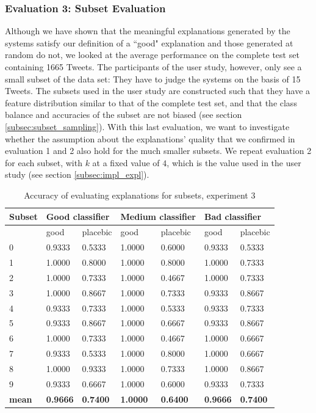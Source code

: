 \subsubsection{Evaluation 3: Subset Evaluation}
Although we have shown that the meaningful explanations generated by the systems satisfy our definition of a ``good" explanation and those generated at random do not, we looked at the average performance on the complete test set containing 1665 Tweets. The participants of the user study, however, only see a small subset of the data set: They have to judge the systems on the basis of 15 Tweets. The subsets used in the user study are constructed such that they have a feature distribution similar to that of the complete test set, and that the class balance and accuracies of the subset are not biased (see section \ref{subsec:subset_sampling}). With this last evaluation, we want to investigate whether the assumption about the explanations' quality that we  confirmed in evaluation 1 and 2 also hold for the much smaller subsets. We repeat evaluation 2 for each subset, with $k$ at a fixed value of $4$, which is the value used in the user study (see section \ref{subsec:impl_expl}).\newline
\begin{table}[H]
	\centering
	\begin{tabular}{l|m{1.4cm}m{1.4cm}|m{1.4cm}m{1.4cm}|m{1.4cm}m{1.4cm}}
		\textbf{Subset} & \multicolumn{2}{l|}{\textbf{Good classifier}} & \multicolumn{2}{l|}{\textbf{Medium classifier}} & \multicolumn{2}{l}{\textbf{Bad classifier}} \\ \midrule
		& good & placebic & good & placebic & good & placebic \\ \midrule
		0 & 0.9333 & 0.5333 & 1.0000 & 0.6000 & 0.9333 & 0.5333 \\
		1 & 1.0000 & 0.8000 & 1.0000 & 0.8000 & 1.0000 & 0.7333 \\
		2 & 1.0000 & 0.7333 & 1.0000 & 0.4667 & 1.0000 & 0.7333 \\
		3 & 1.0000 & 0.8667 & 1.0000 & 0.7333 & 0.9333 & 0.8667 \\
		4 & 0.9333 & 0.7333 & 1.0000 & 0.5333 & 0.9333 & 0.7333 \\
		5 & 0.9333 & 0.8667 & 1.0000 & 0.6667 & 0.9333 & 0.8667 \\
		6 & 1.0000 & 0.7333 & 1.0000 & 0.4667 & 1.0000 & 0.6667 \\
		7 & 0.9333 & 0.5333 & 1.0000 & 0.8000 & 1.0000 & 0.6667 \\
		8 & 1.0000 & 0.9333 & 1.0000 & 0.7333 & 1.0000 & 0.8667 \\
		9 & 0.9333 & 0.6667 & 1.0000 & 0.6000 & 0.9333 & 0.7333 \\ \midrule
		\textbf{mean} & \textbf{0.9666} & \textbf{0.7400} & \textbf{1.0000} & \textbf{0.6400} & \textbf{0.9666} & \textbf{0.7400}  \\ \bottomrule
	\end{tabular}
	\caption{Accuracy of evaluating explanations for subsets, experiment 3}
	\label{tab:exp3}
\end{table}
